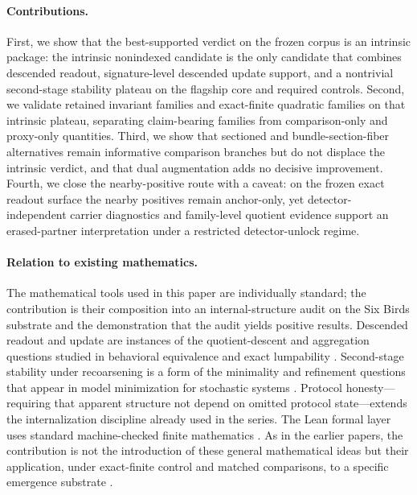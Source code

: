 \documentclass[11pt]{article}
\theoremstyle{definition}
\begin{document}
\paragraph{Contributions.}
First, we show that the best-supported verdict on the frozen corpus is an intrinsic package: the intrinsic nonindexed candidate is the only candidate that combines descended readout, signature-level descended update support, and a nontrivial second-stage stability plateau on the flagship core and required controls. Second, we validate retained invariant families and exact-finite quadratic families on that intrinsic plateau, separating claim-bearing families from comparison-only and proxy-only quantities. Third, we show that sectioned and bundle-section-fiber alternatives remain informative comparison branches but do not displace the intrinsic verdict, and that dual augmentation adds no decisive improvement. Fourth, we close the nearby-positive route with a caveat: on the frozen exact readout surface the nearby positives remain anchor-only, yet detector-independent carrier diagnostics and family-level quotient evidence support an erased-partner interpretation under a restricted detector-unlock regime.

\paragraph{Relation to existing mathematics.}
The mathematical tools used in this paper are individually standard; the contribution is their composition into an internal-structure audit on the Six Birds substrate and the demonstration that the audit yields positive results. Descended readout and update are instances of the quotient-descent and aggregation questions studied in behavioral equivalence and exact lumpability \cite{Sangiorgi2009,VanDerSchaft2004,KemenySnell1976,Buchholz1994}. Second-stage stability under recoarsening is a form of the minimality and refinement questions that appear in model minimization for stochastic systems \cite{GivanDeanGreig2003}. Protocol honesty---requiring that apparent structure not depend on omitted protocol state---extends the internalization discipline already used in the series. The Lean formal layer uses standard machine-checked finite mathematics \cite{deMouraUllrich2021,MathlibCommunity2020}. As in the earlier papers, the contribution is not the introduction of these general mathematical ideas but their application, under exact-finite control and matched comparisons, to a specific emergence substrate \cite{ShaliziCrutchfield2001}.
\end{document}
